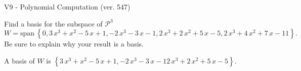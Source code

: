 \begin{exercise}
  \begin{exerciseTitle}V9 - Polynomial Computation (ver. 547)\end{exerciseTitle}
  \begin{exerciseStatement}
    Find a basis for the subspace of \(\mathcal{P}^3\) 
\[W=\mathrm{span}\ \left\{0 , 3 \, x^{3} + x^{2} - 5 \, x + 1 , -2 \, x^{3} - 3 \, x - 1 , 2 \, x^{3} + 2 \, x^{2} + 5 \, x - 5 , 2 \, x^{3} + 4 \, x^{2} + 7 \, x - 11\right\}.\]
 Be sure to explain why your result is a basis.


  \end{exerciseStatement}
  \begin{exerciseAnswer}
   A basis of \(W\) is  \(\left\{3 \, x^{3} + x^{2} - 5 \, x + 1 , -2 \, x^{3} - 3 \, x - 1 2 \, x^{3} + 2 \, x^{2} + 5 \, x - 5\right\}\).
  


  \end{exerciseAnswer}
\end{exercise}